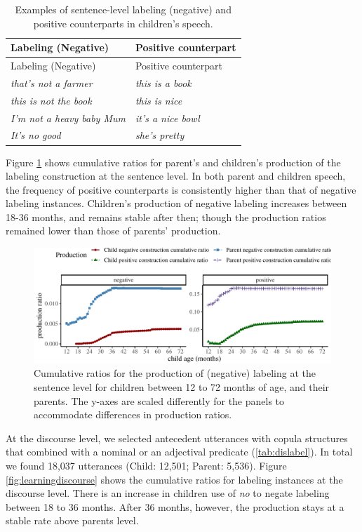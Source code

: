 \documentclass[
  english,
  man,floatsintext]{apa6}
\begin{document}
\begin{longtable}[]{@{}ll@{}}
\caption{\label{tab:label} Examples of sentence-level labeling (negative) and positive counterparts in children's speech.}\tabularnewline
\toprule
Labeling (Negative) & Positive counterpart \\
\midrule
\endfirsthead
\toprule
Labeling (Negative) & Positive counterpart \\
\midrule
\endhead
\emph{that's not a farmer} & \emph{this is a book} \\
\emph{this is not the book} & \emph{this is nice} \\
\emph{I'm not a heavy baby Mum} & \emph{it's a nice bowl} \\
\emph{It's no good} & \emph{she's pretty} \\
\bottomrule
\end{longtable}

Figure \ref{fig:learning} shows cumulative ratios for parent's and children's production of the labeling construction at the sentence level. In both parent and children speech, the frequency of positive counterparts is consistently higher than that of negative labeling instances. Children's production of negative labeling increases between 18-36 months, and remains stable after then; though the production ratios remained lower than those of parents' production.

\begin{figure}[H]

{\centering \includegraphics{neg_construction_article_files/figure-latex/learning-1} 

}

\caption{Cumulative ratios for the production of (negative) labeling at the sentence level for children between 12 to 72 months of age, and their parents. The y-axes are scaled differently for the panels to accommodate differences in production ratios.}\label{fig:learning}
\end{figure}

At the discourse level, we selected antecedent utterances with copula structures that combined with a nominal or an adjectival predicate (\ref{tab:dislabel}). In total we found 18,037 utterances (Child: 12,501; Parent: 5,536). Figure \ref{fig:learningdiscourse} shows the cumulative ratios for labeling instances at the discourse level. There is an increase in children use of \emph{no} to negate labeling between 18 to 36 months. After 36 months, however, the production stays at a stable rate above parents level.
\end{document}

